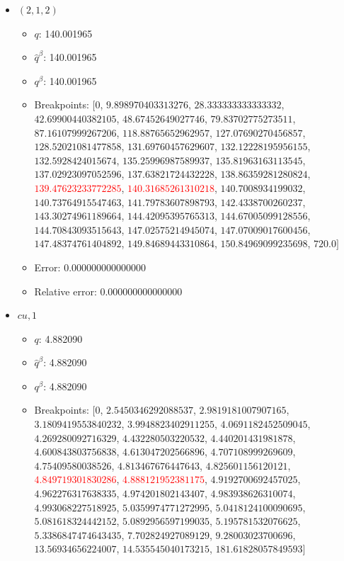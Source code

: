 \documentclass{article}%
\begin{document}
\begin{itemize}
\begin{itemize}
		\item Error: 0.000000000000000%
		\item Relative error: 0.000000000000000%
	\end{itemize}%
	\item $(2, 1, 2)$%
	\begin{itemize}%
		\item $q$: 140.001965%
		\item $\hat{q}^\beta$: 140.001965%
		\item $q^\beta$: 140.001965%
		\item Breakpoints: $[$$0$, $9.898970403313276$, $28.333333333333332$, $42.69900440382105$, $48.67452649027746$, $79.83702775273511$, $87.16107999267206$, $118.88765652962957$, $127.07690270456857$, $128.52021081477858$, $131.69760457629607$, $132.12228195956155$, $132.5928424015674$, $135.25996987589937$, $135.81963163113545$, $137.02923097052596$, $137.63821724432228$, $138.86359281280824$, \textcolor{red}{$139.47623233772285$}, \textcolor{red}{$140.31685261310218$}, $140.7008934199032$, $140.73764915547463$, $141.79783607898793$, $142.4338700260237$, $143.30274961189664$, $144.42095395765313$, $144.67005099128556$, $144.70843093515643$, $147.02575214945074$, $147.07009017600456$, $147.48374761404892$, $149.84689443310864$, $150.84969099235698$, $720.0$$]$%
		\item Error: 0.000000000000000%
		\item Relative error: 0.000000000000000%
	\end{itemize}%
	\item $\textit{cu},1$%
	\begin{itemize}%
		\item $q$: 4.882090%
		\item $\hat{q}^\beta$: 4.882090%
		\item $q^\beta$: 4.882090%
		\item Breakpoints: $[$$0$, $2.5450346292088537$, $2.9819181007907165$, $3.1809419553840232$, $3.9948823402911255$, $4.0691182452509045$, $4.269280092716329$, $4.432280503220532$, $4.440201431981878$, $4.600843803756838$, $4.613047202566896$, $4.707108999269609$, $4.75409580038526$, $4.813467676447643$, $4.825601156120121$, \textcolor{red}{$4.849719301830286$}, \textcolor{red}{$4.888121952381175$}, $4.9192700692457025$, $4.962276317638335$, $4.974201802143407$, $4.983938626310074$, $4.993068227518925$, $5.0359974771272995$, $5.0418124100090695$, $5.081618324442152$, $5.0892956597199035$, $5.195781532076625$, $5.3386847474643435$, $7.702824927089129$, $9.28003023700696$, $13.56934656224007$, $14.535545040173215$, $181.61828057849593$$]$%

\end{itemize}
\end{itemize}
\end{document}
